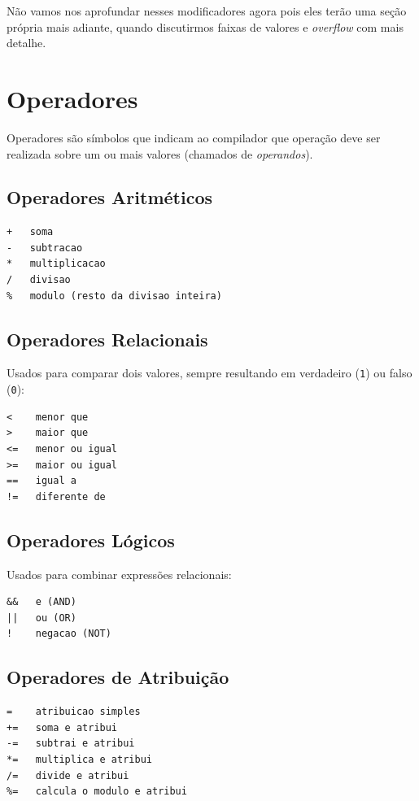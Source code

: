 Não vamos nos aprofundar nesses modificadores agora pois eles terão uma seção própria mais adiante, quando discutirmos faixas de valores e \textit{overflow} com mais detalhe.

\section{Operadores}
Operadores são símbolos que indicam ao compilador que operação deve ser realizada sobre um ou mais valores (chamados de \textit{operandos}).

\subsection{Operadores Aritméticos}
\begin{lstlisting}
+   soma
-   subtracao
*   multiplicacao
/   divisao
%   modulo (resto da divisao inteira)
\end{lstlisting}

\subsection{Operadores Relacionais}
Usados para comparar dois valores, sempre resultando em verdadeiro (\texttt{1}) ou falso (\texttt{0}):

\begin{lstlisting}
<    menor que
>    maior que
<=   menor ou igual
>=   maior ou igual
==   igual a
!=   diferente de
\end{lstlisting}

\subsection{Operadores Lógicos}
Usados para combinar expressões relacionais:

\begin{lstlisting}
&&   e (AND)
||   ou (OR)
!    negacao (NOT)
\end{lstlisting}

\subsection{Operadores de Atribuição}
\begin{lstlisting}
=    atribuicao simples
+=   soma e atribui
-=   subtrai e atribui
*=   multiplica e atribui
/=   divide e atribui
%=   calcula o modulo e atribui
\end{lstlisting}

